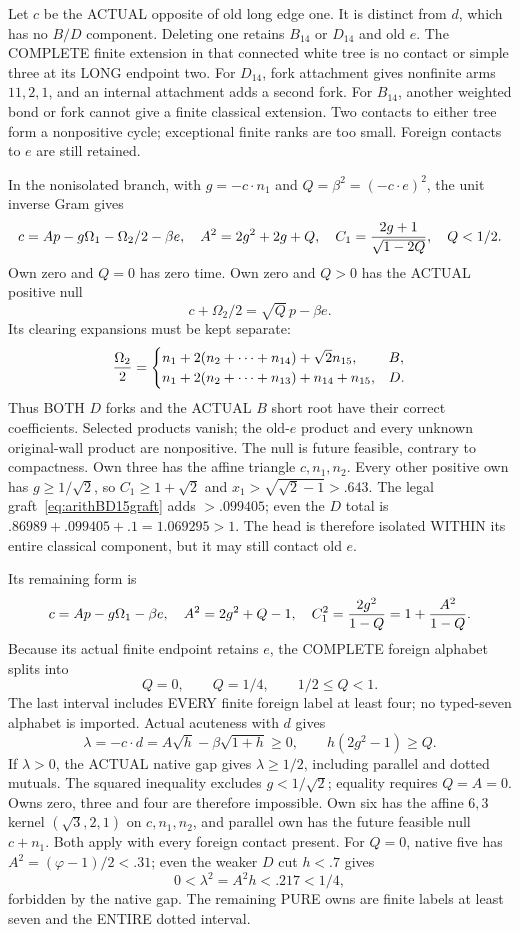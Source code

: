 \documentclass[11pt]{article}
\begin{document}
Let \(c\) be the ACTUAL opposite of old long edge one.
It is distinct from \(d\), which has no \(B/D\) component.
Deleting one retains \(B_{14}\) or \(D_{14}\) and old \(e\).
The COMPLETE finite extension in that connected white tree
is no contact or simple three at its LONG endpoint two.
For \(D_{14}\), fork attachment gives nonfinite arms
\(11,2,1\), and an internal attachment adds a second fork.
For \(B_{14}\), another weighted bond or fork cannot
give a finite classical extension.
Two contacts to either tree form a nonpositive cycle;
exceptional finite ranks are too small.
Foreign contacts to \(e\) are still retained.

In the nonisolated branch, with \(g=-c\cdot n_1\) and
\(Q=\beta^2=(-c\cdot e)^2\), the unit inverse Gram gives
\[
 c=Ap-g\Omega_1-\Omega_2/2-\beta e,\quad
 A^2=2g^2+2g+Q,\quad
 C_1={2g+1\over\sqrt{1-2Q}},\quad Q<1/2 .
\]
Own zero and \(Q=0\) has zero time.
Own zero and \(Q>0\) has the ACTUAL positive null
\[
                         c+\Omega_2/2=\sqrt Q\,p-\beta e .
\]
Its clearing expansions must be kept separate:
\[
 {\Omega_2\over2}=
 \begin{cases}
 n_1+2(n_2+\cdots+n_{14})+\sqrt2 n_{15},&B,\\
 n_1+2(n_2+\cdots+n_{13})+n_{14}+n_{15},&D .
 \end{cases}
\]
Thus BOTH \(D\) forks and the ACTUAL \(B\) short root
have their correct coefficients.
Selected products vanish; the old-\(e\) product and
every unknown original-wall product are nonpositive.
The null is future feasible, contrary to compactness.
Own three has the affine triangle \(c,n_1,n_2\).
Every other positive own has \(g\ge1/\sqrt2\), so
\(C_1\ge1+\sqrt2\) and
\(x_1>\sqrt{\sqrt2-1}>.643\).
The legal graft~\eqref{eq:arithBD15graft} adds \(>.099405\);
even the \(D\) total is
\(.86989+.099405+.1=1.069295>1\).
The head is therefore isolated WITHIN its entire
classical component, but it may still contact old \(e\).

Its remaining form is
\[
 c=Ap-g\Omega_1-\beta e,\quad
 A^2=2g^2+Q-1,\quad
 C_1^2={2g^2\over1-Q}=1+{A^2\over1-Q}.
\]
Because its actual finite endpoint retains \(e\),
the COMPLETE foreign alphabet splits into
\[
                   Q=0,\qquad Q=1/4,\qquad 1/2\le Q<1 .
\]
The last interval includes EVERY finite foreign label
at least four; no typed-seven alphabet is imported.
Actual acuteness with \(d\) gives
\[
 \lambda=-c\cdot d=A\sqrt h-\beta\sqrt{1+h}\ge0,
 \qquad h(2g^2-1)\ge Q .
\tag{R1N}\label{eq:arithBD15native}
\]
If \(\lambda>0\), the ACTUAL native gap gives
\(\lambda\ge1/2\), including parallel and dotted mutuals.
The squared inequality excludes \(g<1/\sqrt2\);
equality requires \(Q=A=0\).
Owns zero, three and four are therefore impossible.
Own six has the affine \(6,3\) kernel \((\sqrt3,2,1)\)
on \(c,n_1,n_2\), and parallel own has the future
feasible null \(c+n_1\).
Both apply with every foreign contact present.
For \(Q=0\), native five has
\(A^2=(\varphi-1)/2<.31\); even the weaker \(D\)
cut \(h<.7\) gives
\[
                         0<\lambda^2=A^2h<.217<1/4 ,
\]
forbidden by the native gap.
The remaining PURE owns are finite labels at least
seven and the ENTIRE dotted interval.
\end{document}
